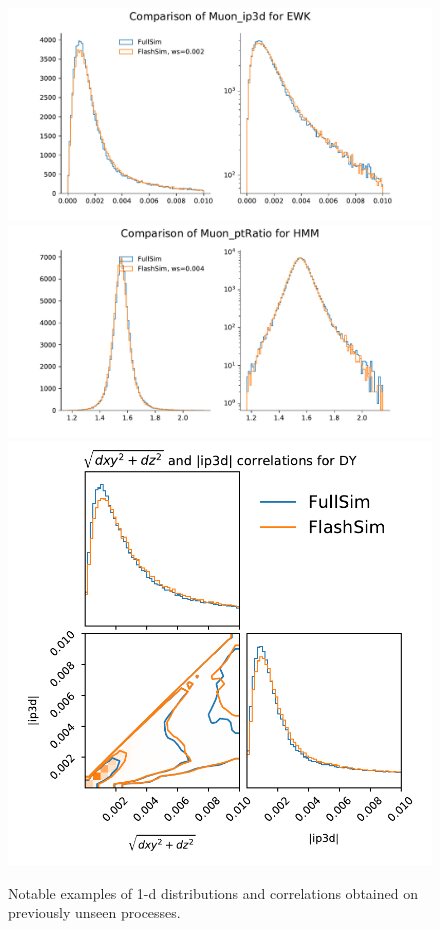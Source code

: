 \begin{figure}
    \myfloatalign
    \includegraphics[width=\linewidth]{gfx/ch5/ewkeval7.pdf} \\
    \includegraphics[width=\linewidth]{gfx/ch5/hmmeval2.pdf} \\
    \includegraphics[width=\linewidth]{gfx/ch5/dycorrs.pdf} 
    \caption[1-d distributions and correlations for new processes]{Notable examples of 1-d distributions and correlations obtained on previously unseen processes.}\label{fig:newsdists}
    
\end{figure}


